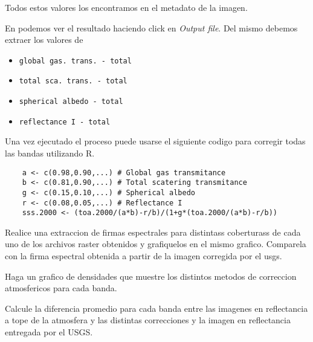Todos estos valores los encontramos en el metadato de la imagen.

En  podemos ver el resultado haciendo click en \emph{Output
file}. Del mismo debemos extraer los valores de
 \begin{itemize}
     \item \texttt{global gas. trans. - total}
     \item \texttt{total sca. trans. - total}
     \item \texttt{spherical albedo - total}
     \item \texttt{reflectance I - total}
 \end{itemize}

Una vez ejecutado el proceso puede usarse el siguiente codigo para corregir
todas las bandas utilizando R.

\begin{lstlisting}
    a <- c(0.98,0.90,...) # Global gas transmitance
    b <- c(0.81,0.90,...) # Total scatering transmitance
    g <- c(0.15,0.10,...) # Spherical albedo
    r <- c(0.08,0.05,...) # Reflectance I
    sss.2000 <- (toa.2000/(a*b)-r/b)/(1+g*(toa.2000/(a*b)-r/b))
\end{lstlisting}


\begin{act}
    Realice una extraccion de firmas espectrales para distintass coberturass de
    cada uno de los archivos raster obtenidos y grafiquelos en el mismo grafico.
    Comparela con la firma espectral obtenida a partir de la imagen corregida
    por el usgs.
\end{act}

\begin{act}
    Haga un grafico de densidades que muestre los distintos metodos de
    correccion atmosfericos para cada banda.
\end{act}

\begin{act}
    Calcule la diferencia promedio para cada banda entre las imagenes en
    reflectancia a tope de la atmosfera y las distintas correcciones
    y la imagen en reflectancia entregada por el USGS.
\end{act}
